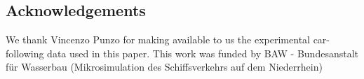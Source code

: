 \documentclass[review]{elsarticle}
\providecommand{\3}{{\ss}}
\begin{document}
	
		\subsection*{Acknowledgements}
		We thank Vincenzo Punzo for making available to us the experimental
		car-following data used in this paper. This work was funded by BAW - Bundesanstalt für Wasserbau (Mikrosimulation des Schiffsverkehrs auf dem Niederrhein)
	
	
	
	
	
	
	
\end{document}
